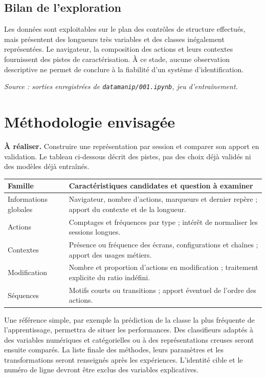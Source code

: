 \documentclass[10pt,a4paper]{article}
\newcommand{\afaire}[1]{\par\smallskip\textcolor{accent}{\textbf{À réaliser.}} #1\par}
\newcommand{\sourceexploration}{\textit{Source : sorties enregistrées de \texttt{datamanip/001.ipynb}, jeu d'entraînement.}}
\begin{document}
\subsection{Bilan de l'exploration}
Les données sont exploitables sur le plan des contrôles de structure
effectués, mais présentent des longueurs très variables et des classes
inégalement représentées. Le navigateur, la composition des actions et
leurs contextes fournissent des pistes de caractérisation. À ce stade,
aucune observation descriptive ne permet de conclure à la fiabilité
d'un système d'identification.

\sourceexploration

\newpage
\section{Méthodologie envisagée}
\afaire{Construire une représentation par session et comparer son apport
en validation. Le tableau ci-dessous décrit des pistes, pas des choix
déjà validés ni des modèles déjà entraînés.}

\begin{center}
\small
\begin{tabularx}{\linewidth}{l Y}
\toprule
Famille & Caractéristiques candidates et question à examiner \\
\midrule
Informations globales & Navigateur, nombre d'actions, marqueurs et dernier repère ; apport du contexte et de la longueur. \\
Actions & Comptages et fréquences par type ; intérêt de normaliser les sessions longues. \\
Contextes & Présence ou fréquence des écrans, configurations et chaînes ; apport des usages métiers. \\
Modification & Nombre et proportion d'actions en modification ; traitement explicite du ratio indéfini. \\
Séquences & Motifs courts ou transitions ; apport éventuel de l'ordre des actions. \\
\bottomrule
\end{tabularx}
\end{center}

Une référence simple, par exemple la prédiction de la classe la plus
fréquente de l'apprentissage, permettra de situer les performances. Des
classifieurs adaptés à des variables numériques et catégorielles ou à
des représentations creuses seront ensuite comparés. La liste finale
des méthodes, leurs paramètres et les transformations seront renseignés
après les expériences. L'identité cible et le numéro de ligne devront
être exclus des variables explicatives.
\end{document}
